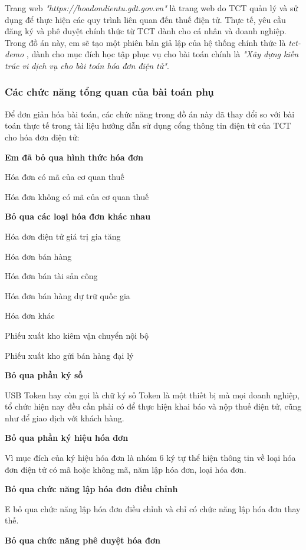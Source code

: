 Trang web \emph{"https://hoadondientu.gdt.gov.vn"} là trang web do TCT quản lý và sử dụng để thực hiện các quy trình liên quan đến thuế điện tử. Thực tế, yêu cầu đăng ký và phê duyệt chính thức từ TCT dành cho cá nhân và doanh nghiệp. Trong đồ án này, em sẽ tạo một phiên bản giả lập của hệ thống chính thức là \emph{tct-demo} , dành cho mục đích học tập phục vụ cho bài toán chính là \emph{"Xây dựng kiến trúc vi dịch vụ cho bài toán hóa đơn điện tử"}.

\subsubsection{Các chức năng tổng quan của bài toán phụ}

Để đơn giản hóa bài toán, các chức năng trong đồ án này đã thay đổi so với bài toán thực tế trong tài liệu hướng dẫn sử dụng cổng thông tin điện tử của TCT cho hóa đơn điện tử:

\textbf{Em đã bỏ qua hình thức hóa đơn}

Hóa đơn có mã của cơ quan thuế

Hóa đơn không có mã của cơ quan thuế

\textbf{Bỏ qua các loại hóa đơn khác nhau}

Hóa đơn điện tử giá trị gia tăng

Hóa đơn bán hàng

Hóa đơn bán tài sản công

Hóa đơn bán hàng dự trữ quốc gia

Hóa đơn khác

Phiếu xuất kho kiêm vận chuyển nội bộ

Phiếu xuất kho gửi bán hàng đại lý

\textbf{Bỏ qua phần ký số}

USB Token hay còn gọi là chữ ký số Token là một thiết bị mà mọi doanh nghiệp, tổ chức hiện nay đều cần phải có để thực hiện khai báo và nộp thuế điện tử, cũng như để giao dịch với khách hàng.

\textbf{Bỏ qua phần ký hiệu hóa đơn}

Vì mục đích của ký hiệu hóa đơn là nhóm 6 ký tự thể hiện thông tin về loại hóa đơn điện tử có mã hoặc không mã, năm lập hóa đơn, loại hóa đơn.

\textbf{Bỏ qua chức năng lập hóa đơn điều chỉnh}

E bỏ qua chức năng lập hóa đơn điều chỉnh và chỉ có chức năng lập hóa đơn thay thế.

\textbf{Bỏ qua chức năng phê duyệt hóa đơn}

